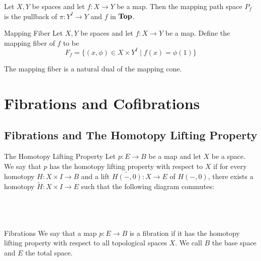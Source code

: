 \documentclass[a4paper]{article}
\begin{document}
\begin{prp}{}{} Let $X,Y$ be spaces and let $f:X\to Y$ be a map. Then the mapping path space $P_f$ is the pullback of $\pi:Y^I\to Y$ and $f$ in $\bold{Top}$. 
\end{prp}

\begin{defn}{Mapping Fiber}{} Let $X,Y$ be spaces and let $f:X\to Y$ be a map. Define the mapping fiber of $f$ to be $$F_f=\{(x,\phi)\in X\times Y^I\;|\;f(x)=\phi(1)\}$$
\end{defn}

The mapping fiber is a natural dual of the mapping cone. 

\pagebreak
\section{Fibrations and Cofibrations}
\subsection{Fibrations and The Homotopy Lifting Property}
\begin{defn}{The Homotopy Lifting Property}{} Let $p:E\to B$ be a map and let $X$ be a space. We say that $p$ has the homotopy lifting property with respect to $X$ if for every homotopy $H:X\times I\to B$ and a lift $\widetilde{H(-,0)}:X\to E$ of $H(-,0)$, there exists a homotopy $\widetilde{H}:X\times I\to E$ such that the following diagram commutes: \\~\\
\\~\\
\end{defn}

\begin{defn}{Fibrations}{} We say that a map $p:E\to B$ is a fibration if it has the homotopy lifting property with respect to all topological spaces $X$. We call $B$ the base space and $E$ the total space. 
\end{defn}
\end{document}
